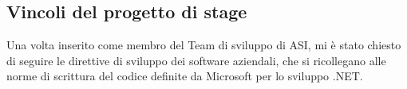 \subsection{Vincoli del progetto di stage}
Una volta inserito come membro del Team di sviluppo di ASI, mi è stato chiesto di seguire le direttive di sviluppo dei software aziendali, che si ricollegano alle norme di scrittura del codice definite da Microsoft per lo sviluppo .NET.









